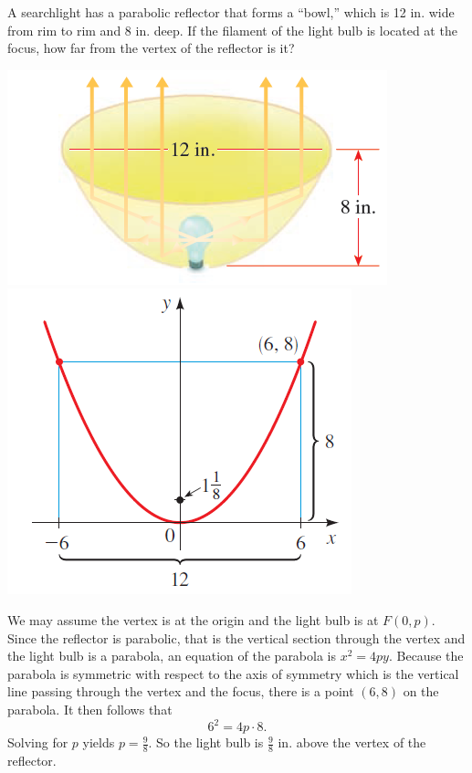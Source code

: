 \begin{example}
    A searchlight has a parabolic reflector that forms a “bowl,” which is 12 in. wide from rim to rim and 8 in. deep.  If the filament of the light bulb is located at the focus, how far from the vertex of the reflector is it?
\end{example}
\vspace{-2\baselineskip}
\begin{center}
    \noindent
    \includegraphics[height=8\baselineskip,keepaspectratio]{figs/SearchlightReflector1.png}
    \hspace{2em}
    \includegraphics[height=9\baselineskip,keepaspectratio]{figs/SearchlightReflector2.png}
\end{center}

\begin{solution}
    We may assume the vertex is at the origin and the light bulb is at $F(0, p)$.
    Since the reflector is parabolic, that is the vertical section through the vertex and the light bulb is a parabola, an equation of the parabola is $x^2=4py$.
    Because the parabola is symmetric with respect to the axis of symmetry which is the vertical line passing through the vertex and the focus, there is a point $(6,8)$ on the parabola. It then follows that
    \[6^2=4p\cdot 8.\]
    Solving for $p$ yields $p=\frac{9}{8}$. So the light bulb is $\frac{9}{8}$ in. above the vertex of the reflector.
\end{solution}

